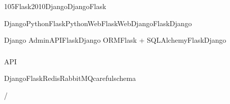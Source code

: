 \important{}\important{}105Flask2010Django\important{}DjangoFlask

\important{}DjangoPythonFlaskPythonWebFlaskWebDjango\important{}FlaskDjango

\important{}\important{}Django AdminAPIFlask\important{}Django ORMFlask
+ SQLAlchemy\important{}FlaskDjango

\hypertarget{section-88}{%
\subsubsection{}\label{section-88}}

API

\important{}DjangoFlask\important{}RedisRabbitMQ\important{}carefulschema\important{}

\important{}\important{}\important{}\important{}/

